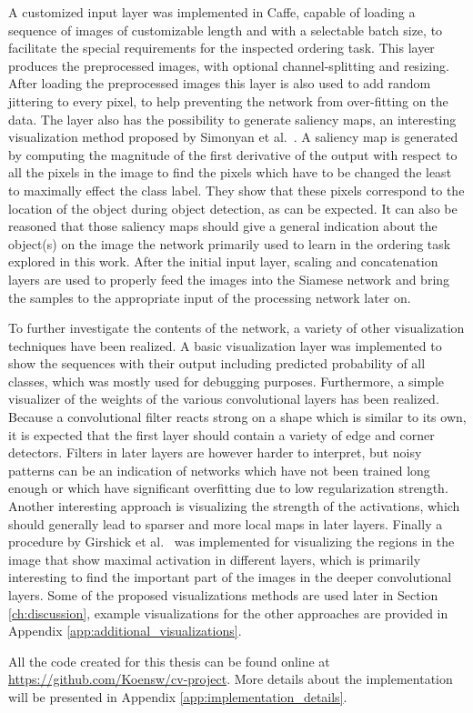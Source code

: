 A customized input layer was implemented in Caffe, capable of loading a sequence of images of customizable length and with a selectable batch size, to facilitate the special requirements for the inspected ordering task. This layer produces the preprocessed images, with optional channel-splitting and resizing. After loading the preprocessed images this layer is also used to add random jittering to every pixel, to help preventing the network from over-fitting on the data. The layer also has the possibility to generate saliency maps, an interesting visualization method proposed by Simonyan et al.~\cite{simonyan2013}. A saliency map is generated by computing the magnitude of the first derivative of the output with respect to all the pixels in the image to find the pixels which have to be changed the least to maximally effect the class label. They show that these pixels correspond to the location of the object during object detection, as can be expected. It can also be reasoned that those saliency maps should give a general indication about the object(s) on the image the network primarily used to learn in the ordering task explored in this work. After the initial input layer, scaling and concatenation layers are used to properly feed the images into the Siamese network and bring the samples to the appropriate input of the processing network later on.

To further investigate the contents of the network, a variety of other visualization techniques have been realized. A basic visualization layer was implemented to show the sequences with their output including predicted probability of all classes, which was mostly used for debugging purposes. Furthermore, a simple visualizer of the weights of the various convolutional layers has been realized. Because a convolutional filter reacts strong on a shape which is similar to its own, it is expected that the first layer should contain a variety of edge and corner detectors. Filters in later layers are however harder to interpret, but noisy patterns can be an indication of networks which have not been trained long enough or which have significant overfitting due to low regularization strength. Another interesting approach is visualizing the strength of the activations, which should generally lead to sparser and more local maps in later layers. Finally a procedure by Girshick et al.~\cite{girshick2014} was implemented for visualizing the regions in the image that show maximal activation in different layers, which is primarily interesting to find the important part of the images in the deeper convolutional layers. Some of the proposed visualizations methods are used later in Section \ref{ch:discussion}, example visualizations for the other approaches are provided in Appendix \ref{app:additional_visualizations}.

All the code created for this thesis can be found online at \url{https://github.com/Koensw/cv-project}.  More details about the implementation will be presented in Appendix \ref{app:implementation_details}.
